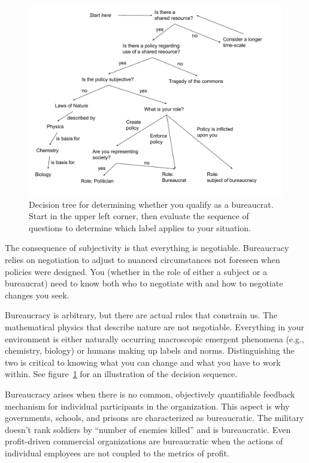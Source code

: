 \begin{figure}
    \centering
    \includegraphics[width=1.05\textwidth]{images/am_I_a_bureaucrat.pdf}
    \caption{Decision tree for determining whether you qualify as a bureaucrat. Start in the upper left corner, then evaluate the sequence of questions to determine which label applies to your situation.}
    \label{fig:am-I-a-bureaucrat}
\end{figure}

The consequence of subjectivity is that everything is negotiable. Bureaucracy relies on negotiation to adjust to nuanced circumstances not foreseen when policies were designed.  You (whether in the role of either a subject or a bureaucrat) need to know both who to negotiate with and how to negotiate changes you seek. 

Bureaucracy is arbitrary, but there are actual rules that constrain us. The mathematical physics that describe nature are not negotiable. Everything in your environment is either naturally occurring macroscopic emergent phenomena (e.g., chemistry, biology) or humans making up labels and norms. Distinguishing the two is critical to knowing what you can change and what you have to work within. See figure~\ref{fig:am-I-a-bureaucrat}\iftoggle{haspagenumbers}{ on page~\pageref{fig:am-I-a-bureaucrat}}{} for an illustration of the decision sequence.

Bureaucracy arises when there is no common, objectively quantifiable feedback mechanism for individual participants in the organization. This aspect is why governments, schools, and prisons are characterized as bureaucratic. 
The military doesn't rank soldiers by ``number of enemies killed'' and is bureaucratic. 
Even profit-driven commercial organizations are bureaucratic when the actions of individual employees are not coupled to the metrics of profit. %

